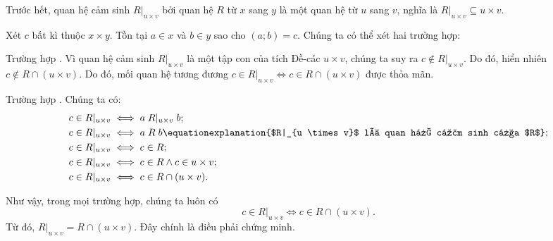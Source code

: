 \solution

Trước hết, quan hệ cảm sinh $R|_{u \times v}$ bởi quan hệ $R$ từ $x$ sang $y$ là một quan hệ từ $u$ sang $v$, nghĩa là $R|_{u \times v} \subseteq u \times v$.
   
Xét $c$ bất kì thuộc $x \times y$. Tồn tại $a \in x$ và $b \in y$ sao cho $(a; b) = c$. Chúng ta có thể xét hai trường hợp:

Trường hợp .
Vì quan hệ cảm sinh $R|_{u \times v}$ là một tập con của tích Đề-các $u \times v$, chúng ta suy ra $c \notin R|_{u \times v}$. Do đó, hiển nhiên 
   $c \notin R \cap (u \times v)$.
Do đó, mối quan hệ tương đương $c \in R|_{u \times v} \iff c \in R \cap (u \times v)$ được thỏa mãn.

Trường hợp . Chúng ta có:
\begin{align*}
   c \in R|_{u \times v} &\iff a\;R|_{u \times v}\;b; \\
   c \in R|_{u \times v} &\iff a\;R\;b \equationexplanation{$R|_{u \times v}$ là quan hệ cảm sinh của $R$}; \\
   c \in R|_{u \times v} &\iff c \in R; \\
   c \in R|_{u \times v} &\iff c \in R \land c \in u \times v; \\
   c \in R|_{u \times v} &\iff c \in R \cap (u \times v).
\end{align*}

Như vậy, trong mọi trường hợp, chúng ta luôn có
\begin{equation*}
   c \in R|_{u \times v} \iff c \in R \cap (u \times v).
\end{equation*}
Từ đó, $R|_{u \times v} = R \cap (u \times v).$ Đây chính là điều phải chứng minh.

